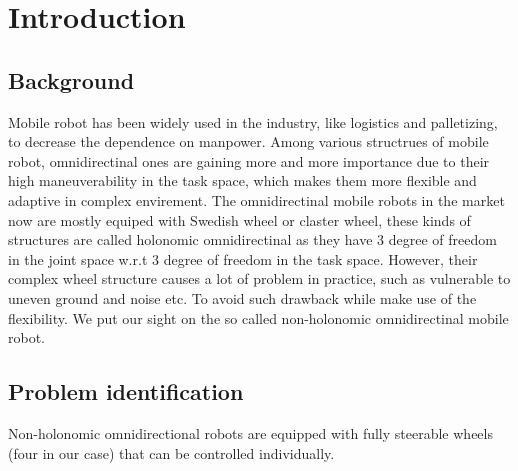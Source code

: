 \chapter{Introduction}
\label{cha:introduction}

\section{Background}
\label{sec:background}
Mobile robot has been widely used in the industry, like logistics and palletizing, to decrease the dependence on manpower. Among various structrues of mobile robot, omnidirectinal ones are gaining more and more 
importance due to their high maneuverability in the task space, which makes them more flexible and adaptive in complex envirement. The omnidirectinal mobile robots in the market now are mostly equiped with 
Swedish wheel or claster wheel, these kinds of structures are called holonomic omnidirectinal as they have 3 degree of freedom in the joint space w.r.t 3 degree of freedom in the task space. However, their complex 
wheel structure causes a lot of problem in practice, such as vulnerable to uneven ground and noise etc. To avoid such drawback while make use of the flexibility. We put our sight on the so called non-holonomic 
omnidirectinal mobile robot. 

\section{Problem identification}
\label{sec:problemIdentification}
Non-holonomic omnidirectional robots are equipped with fully steerable wheels (four in our case) that can be controlled individually.



